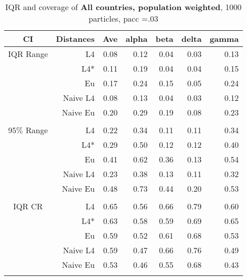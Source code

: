 \documentclass[a4paper,12pt,twoside]{book}
\begin{document}
\begin{table}[H]
\centering
\caption{IQR and coverage of \textbf{All countries, population weighted}, 1000 particles, pacc =.03}

\begin{tabular}{crrrrrr}
  \hline
{\color{blue}CI} & Distances & Ave & alpha & beta & delta & gamma \\ 
  \hline
{\color{blue}IQR Range} & L4  &0.08 & 0.12 & 0.04 & 0.03 & 0.13 \\ 
  
&L4*  &0.11 & 0.19 & 0.04 & 0.04 & 0.15 \\ 
  
&Eu &     0.17 & 0.24 & 0.15 & 0.05 & 0.24 \\ 
  
&Naive L4& 0.08 & 0.13 & 0.04 & 0.03 & 0.12 \\ 
&Naive Eu &  0.20 & 0.29 & 0.19 & 0.08 & 0.23 \\ \\
 
    {\color{blue}95$\%$ Range} & L4  &0.22 & 0.34 & 0.11 & 0.11 & 0.34 \\ 
  
    &L4*  & 0.29 & 0.50 & 0.12 & 0.12 & 0.40 \\ 
  
&Eu &   0.41 & 0.62 & 0.36 & 0.13 & 0.54 \\ 
  
&Naive L4&   0.23 & 0.38 & 0.13 & 0.11 & 0.32 \\ 
 
&Naive Eu &   0.48 & 0.73 & 0.44 & 0.20 & 0.53 \\ \\
  
   \hline
   
{\color{blue} IQR CR } & L4  &0.65 & 0.56 & 0.66 & 0.79 & 0.60 \\ 
  

&L4*  &  0.63 & 0.58 & 0.59 & 0.69 & 0.65 \\ 
  
 
&Eu &    0.59 & 0.52 & 0.61 & 0.68 & 0.53 \\ 
   
&Naive L4& 0.59 & 0.47 & 0.66 & 0.76 & 0.49 \\
&Naive Eu &  0.53 & 0.46 & 0.55 & 0.68 & 0.43 \\ \\
  


\end{tabular}
\end{table}
\end{document}
